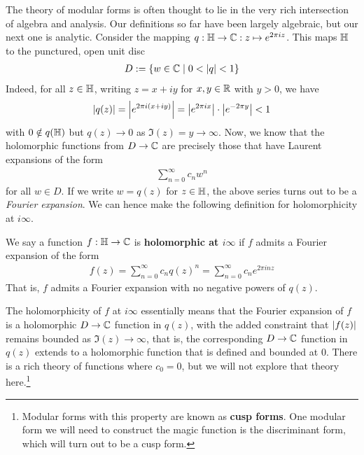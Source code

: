 The theory of modular forms is often thought to lie in the very rich intersection of algebra and analysis. Our definitions so far have been largely algebraic, but our next one is analytic. Consider the mapping $q : \mathbb{H} \to \mathbb{C} : z \mapsto e^{2\pi i z}$. This maps $\mathbb{H}$ to the punctured, open unit disc
\begin{align*}
    D := \left\{ w \in \mathbb{C} \; \middle\vert \; 0 < \left\lvert q \right\rvert < 1 \right\}
\end{align*}
Indeed, for all $z \in \mathbb{H}$, writing $z = x + iy$ for $x, y \in \mathbb{R}$ with $y > 0$, we have
\begin{align*}
    \left\lvert q(z) \right\rvert = \left\lvert e^{2 \pi i \left( x + iy \right)} \right\rvert = \left\lvert e^{2\pi i x} \right\rvert \cdot \left\lvert e^{-2\pi y} \right\rvert < 1
\end{align*}
with $0 \notin q\!\left( \mathbb{H} \right)$ but $q(z) \to 0$ as $\Im(z) = y \to \infty$. Now, we know that the holomorphic functions from $D \to \mathbb{C}$ are precisely those that have Laurent expansions of the form
\begin{align*}
    \sum_{n=0}^{\infty} c_n w^n
\end{align*}
for all $w \in D$. If we write $w = q(z)$ for $z \in \mathbb{H}$, the above series turns out to be a \textit{Fourier expansion}. We can hence make the following definition for holomorphicity at $i\infty$.

\begin{boxdefinition}\label{Ch2:Def:Holo_at_ImInfty}
    We say a function $f : \mathbb{H} \to \mathbb{C}$ is \textbf{holomorphic at $i\infty$} if $f$ admits a Fourier expansion of the form
    \begin{align*}
        f(z) = \sum_{n=0}^{\infty} c_n q(z)^n = \sum_{n=0}^{\infty} c_n e^{2\pi i nz}
    \end{align*}
    That is, $f$ admits a Fourier expansion with no negative powers of $q(z)$.
\end{boxdefinition}

The holomorphicity of $f$ at $i\infty$ essentially means that the Fourier expansion of $f$ is a holomorphic $D \to \mathbb{C}$ function in $q(z)$, with the added constraint that $\left\lvert f(z) \right\rvert$ remains bounded as $\Im(z) \to \infty$, that is, the corresponding $D \to \mathbb{C}$ function in $q(z)$ extends to a holomorphic function that is defined and bounded at $0$. There is a rich theory of functions where $c_0 = 0$, but we will not explore that theory here.\footnote{Modular forms with this property are known as \textbf{cusp forms}. One modular form we will need to construct the magic function is the discriminant form, which will turn out to be a cusp form.}

